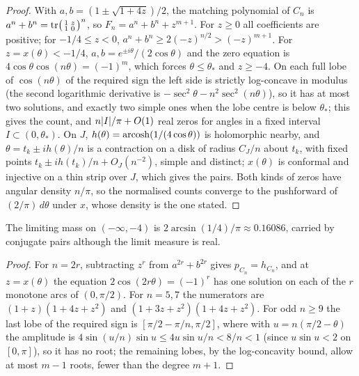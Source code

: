 \begin{proof}
With $a,b=(1\pm\sqrt{1+4z})/2$, the matching polynomial of $C_n$ is
$a^n+b^n=\operatorname{tr}\bigl(\begin{smallmatrix}1&z\\1&0\end{smallmatrix}\bigr)^n$, so
$F_n=a^n+b^n+z^{m+1}$. For $z\ge0$ all coefficients are positive; for
$-1/4\le z<0$, $a^n+b^n\ge2(-z)^{n/2}>(-z)^{m+1}$. For $z=x(\theta)<-1/4$,
$a,b=e^{\pm i\theta}/(2\cos\theta)$ and the zero equation is
$4\cos\theta\cos(n\theta)=(-1)^m$, which forces $\theta\le\theta_*$ and
$z\ge-4$. On each full lobe of $\cos(n\theta)$ of the required sign the left
side is strictly log-concave in modulus (the second logarithmic derivative is
$-\sec^2\theta-n^2\sec^2(n\theta)$), so it has at most two solutions, and
exactly two simple ones when the lobe centre is below $\theta_*$; this gives
the count, and $n\lvert I\rvert/\pi+O(1)$ real zeros for angles in a fixed interval
$I\subset(0,\theta_*)$. On $J$, $h(\theta)=\operatorname{arcosh}(1/(4\cos\theta))$ is
holomorphic nearby, and $\theta=t_k\pm ih(\theta)/n$ is a contraction on a
disk of radius $C_J/n$ about $t_k$, with fixed points
$t_k\pm ih(t_k)/n+O_J(n^{-2})$, simple and distinct; $x(\theta)$ is conformal
and injective on a thin strip over $J$, which gives the pairs. Both kinds of
zeros have angular density $n/\pi$, so the normalised counts converge to the
pushforward of $(2/\pi)\,d\theta$ under $x$, whose density is the one stated.
\end{proof}

The limiting mass on $(-\infty,-4)$ is $2\arcsin(1/4)/\pi\approx0.16086$,
carried by conjugate pairs although the limit measure is real.


\begin{proof}
For $n=2r$, subtracting $z^r$ from $a^{2r}+b^{2r}$ gives $p_{C_n}=h_{C_n}$,
and at $z=x(\theta)$ the equation $2\cos(2r\theta)=(-1)^r$ has one solution
on each of the $r$ monotone arcs of $(0,\pi/2)$. For $n=5,7$ the numerators
are $(1+z)(1+4z+z^2)$ and $(1+3z+z^2)(1+4z+z^2)$. For odd $n\ge9$ the last lobe
of the required sign is $[\pi/2-\pi/n,\pi/2]$, where with $u=n(\pi/2-\theta)$
the amplitude is $4\sin(u/n)\sin u\le4u\sin u/n<8/n<1$ (since $u\sin u<2$ on
$[0,\pi]$), so it has no root; the remaining lobes, by the log-concavity
bound, allow at most $m-1$ roots, fewer than the degree $m+1$.
\end{proof}

